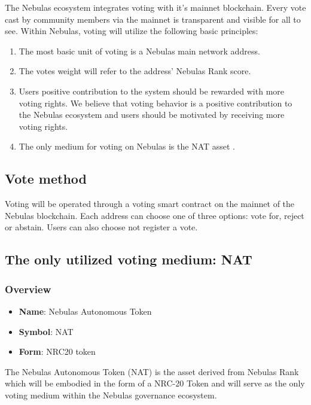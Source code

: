 The Nebulas ecosystem integrates voting with it's mainnet blockchain. Every vote cast by community members via the mainnet is transparent and visible for all to see. Within Nebulas, voting will utilize the following basic principles:

\begin{enumerate}
	\item The most basic unit of voting is a Nebulas main network address.
	\item The votes weight will refer to the address' Nebulas Rank score.
	\item Users positive contribution to the system should be rewarded with more voting rights. We believe that voting behavior is a positive contribution to the Nebulas ecosystem and users should be motivated by receiving more voting rights.
	\item The only medium for voting on Nebulas is the NAT asset .
\end{enumerate}

\subsection{Vote method}

Voting will be operated through a voting smart contract on the mainnet of the Nebulas blockchain. Each address can choose one of three options: vote for, reject or abstain. Users can also choose not register a vote.

\subsection{The only utilized voting medium: NAT}
\label{nat}

\subsubsection{Overview}

\begin{itemize}
	\item \textbf{Name}: Nebulas Autonomous Token
	\item \textbf{Symbol}: NAT
	\item \textbf{Form}: NRC20 token
\end{itemize}

The Nebulas Autonomous Token (NAT) is the asset derived from Nebulas Rank which will be embodied in the form of a NRC-20 Token and will serve as the only voting medium within the Nebulas governance ecosystem.

